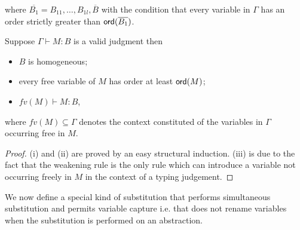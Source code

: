 where $\overline{B_1} = B_{11}, \ldots, B_{1l},\overline{B}$ with
the condition that every variable in $\Gamma$ has an order strictly greater
than ${\sf ord}(\overline{B_1})$.






\begin{property}
\label{proper:safe_basic_prop} Suppose $\Gamma \vdash M : B$ is a
valid judgment then
\begin{itemize}
\item[(i)] $B$ is homogeneous;
\item[(ii)] every free variable of $M$ has order at least ${\sf ord}(M)$;
\item[(iii)] $fv(M) \vdash M : B$,
\end{itemize}
where $fv(M) \subseteq \Gamma$ denotes the context constituted of the variables
in $\Gamma$ occurring free in $M$.
\end{property}
\begin{proof}
(i) and (ii) are proved by an easy structural induction. (iii) is
due to the fact that the weakening rule is the only rule which can
introduce a variable not occurring freely in $M$ in the context of a
typing judgement.
\end{proof}

We now define a special kind of substitution that performs
simultaneous substitution and permits variable capture i.e. that
does not rename variables when the substitution is performed on an
abstraction.

